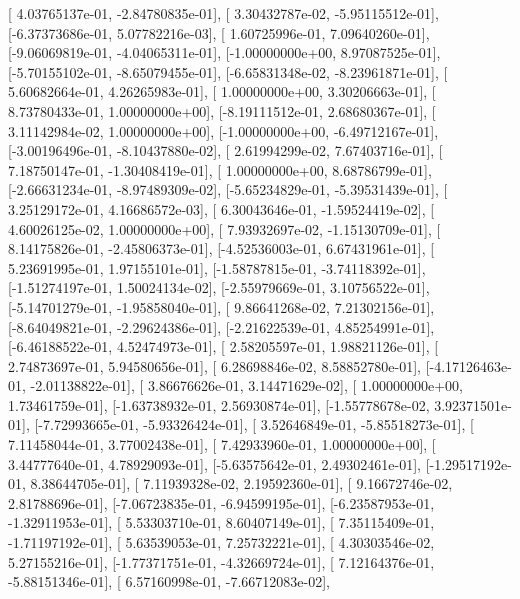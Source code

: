 \documentclass{article}
\begin{document}
       [ 4.03765137e-01, -2.84780835e-01],
       [ 3.30432787e-02, -5.95115512e-01],
       [-6.37373686e-01,  5.07782216e-03],
       [ 1.60725996e-01,  7.09640260e-01],
       [-9.06069819e-01, -4.04065311e-01],
       [-1.00000000e+00,  8.97087525e-01],
       [-5.70155102e-01, -8.65079455e-01],
       [-6.65831348e-02, -8.23961871e-01],
       [ 5.60682664e-01,  4.26265983e-01],
       [ 1.00000000e+00,  3.30206663e-01],
       [ 8.73780433e-01,  1.00000000e+00],
       [-8.19111512e-01,  2.68680367e-01],
       [ 3.11142984e-02,  1.00000000e+00],
       [-1.00000000e+00, -6.49712167e-01],
       [-3.00196496e-01, -8.10437880e-02],
       [ 2.61994299e-02,  7.67403716e-01],
       [ 7.18750147e-01, -1.30408419e-01],
       [ 1.00000000e+00,  8.68786799e-01],
       [-2.66631234e-01, -8.97489309e-02],
       [-5.65234829e-01, -5.39531439e-01],
       [ 3.25129172e-01,  4.16686572e-03],
       [ 6.30043646e-01, -1.59524419e-02],
       [ 4.60026125e-02,  1.00000000e+00],
       [ 7.93932697e-02, -1.15130709e-01],
       [ 8.14175826e-01, -2.45806373e-01],
       [-4.52536003e-01,  6.67431961e-01],
       [ 5.23691995e-01,  1.97155101e-01],
       [-1.58787815e-01, -3.74118392e-01],
       [-1.51274197e-01,  1.50024134e-02],
       [-2.55979669e-01,  3.10756522e-01],
       [-5.14701279e-01, -1.95858040e-01],
       [ 9.86641268e-02,  7.21302156e-01],
       [-8.64049821e-01, -2.29624386e-01],
       [-2.21622539e-01,  4.85254991e-01],
       [-6.46188522e-01,  4.52474973e-01],
       [ 2.58205597e-01,  1.98821126e-01],
       [ 2.74873697e-01,  5.94580656e-01],
       [ 6.28698846e-02,  8.58852780e-01],
       [-4.17126463e-01, -2.01138822e-01],
       [ 3.86676626e-01,  3.14471629e-02],
       [ 1.00000000e+00,  1.73461759e-01],
       [-1.63738932e-01,  2.56930874e-01],
       [-1.55778678e-02,  3.92371501e-01],
       [-7.72993665e-01, -5.93326424e-01],
       [ 3.52646849e-01, -5.85518273e-01],
       [ 7.11458044e-01,  3.77002438e-01],
       [ 7.42933960e-01,  1.00000000e+00],
       [ 3.44777640e-01,  4.78929093e-01],
       [-5.63575642e-01,  2.49302461e-01],
       [-1.29517192e-01,  8.38644705e-01],
       [ 7.11939328e-02,  2.19592360e-01],
       [ 9.16672746e-02,  2.81788696e-01],
       [-7.06723835e-01, -6.94599195e-01],
       [-6.23587953e-01, -1.32911953e-01],
       [ 5.53303710e-01,  8.60407149e-01],
       [ 7.35115409e-01, -1.71197192e-01],
       [ 5.63539053e-01,  7.25732221e-01],
       [ 4.30303546e-02,  5.27155216e-01],
       [-1.77371751e-01, -4.32669724e-01],
       [ 7.12164376e-01, -5.88151346e-01],
       [ 6.57160998e-01, -7.66712083e-02],
\end{document}
